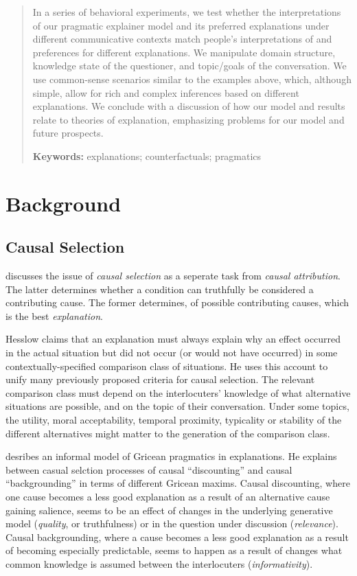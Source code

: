 \documentclass[10pt,letterpaper]{article}
\begin{document}
\begin{abstract}
In a series of behavioral experiments, we test whether the interpretations of our pragmatic explainer model and its preferred explanations under different communicative contexts match people's interpretations of and preferences for different explanations. We manipulate domain structure, knowledge state of the questioner, and topic/goals of the conversation. We use common-sense scenarios similar to the examples above, which, although simple, allow for rich and complex inferences based on different explanations. We conclude with a discussion of how our model and results relate to theories of explanation, emphasizing problems for our model and future prospects.

\textbf{Keywords:} 
explanations; counterfactuals; pragmatics
\end{abstract}

\section{Background}

\subsection{Causal Selection}

 discusses the issue of \emph{causal selection} as a seperate task from \emph{causal attribution}.
The latter determines whether a condition can truthfully be considered a contributing cause.
The former determines, of possible contributing causes, which is the best \emph{explanation}.

Hesslow claims that an explanation must always explain why an effect occurred in the actual situation but did not occur (or would not have occurred) in some contextually-specified comparison class of situations.
He uses this account to unify many previously proposed criteria for causal selection. %
The relevant comparison class must depend on the interlocuters' knowledge of what alternative situations are possible, and on the topic of their conversation.
Under some topics, the utility, moral acceptability, temporal proximity, typicality or stability of the different alternatives might matter to the generation of the comparison class.

 desribes an informal model of Gricean pragmatics in explanations.
He explains between casual selction processes of causal ``discounting'' and causal ``backgrounding'' in terms of different Gricean maxims.
Causal discounting, where one cause becomes a less good explanation as a result of an alternative cause gaining salience, seems to be an effect of changes in the underlying generative model (\emph{quality}, or truthfulness) or in the question under discussion (\emph{relevance}).
Causal backgrounding, where a cause becomes a less good explanation as a result of becoming especially predictable, seems to happen as a result of changes what common knowledge is assumed between the interlocuters (\emph{informativity}).
\end{document}
